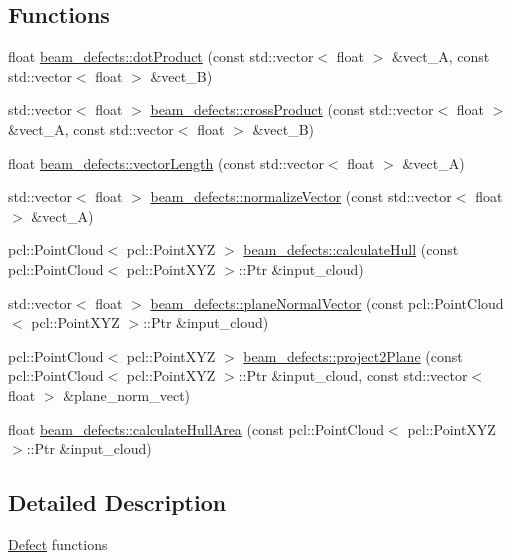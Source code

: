 \subsection*{Functions}
\begin{DoxyCompactItemize}
\item 
float \hyperlink{group__defects_ga5b7a4f073fbd3207f691f74f63434760}{beam\+\_\+defects\+::dot\+Product} (const std\+::vector$<$ float $>$ \&vect\+\_\+A, const std\+::vector$<$ float $>$ \&vect\+\_\+B)
\item 
std\+::vector$<$ float $>$ \hyperlink{group__defects_gacd54112957db923dfdbe7c0ef41bb462}{beam\+\_\+defects\+::cross\+Product} (const std\+::vector$<$ float $>$ \&vect\+\_\+A, const std\+::vector$<$ float $>$ \&vect\+\_\+B)
\item 
float \hyperlink{group__defects_ga08560ea24958bd0c8ff074c2cb15c946}{beam\+\_\+defects\+::vector\+Length} (const std\+::vector$<$ float $>$ \&vect\+\_\+A)
\item 
std\+::vector$<$ float $>$ \hyperlink{group__defects_ga1f650bbe03aace0d1b8a53291f6f41ed}{beam\+\_\+defects\+::normalize\+Vector} (const std\+::vector$<$ float $>$ \&vect\+\_\+A)
\item 
pcl\+::\+Point\+Cloud$<$ pcl\+::\+Point\+X\+YZ $>$ \hyperlink{group__defects_ga748f611e9ef5f651b856652b0cb5ed7e}{beam\+\_\+defects\+::calculate\+Hull} (const pcl\+::\+Point\+Cloud$<$ pcl\+::\+Point\+X\+YZ $>$\+::Ptr \&input\+\_\+cloud)
\item 
std\+::vector$<$ float $>$ \hyperlink{group__defects_gafee51f4fea21e59f8574542070c232ec}{beam\+\_\+defects\+::plane\+Normal\+Vector} (const pcl\+::\+Point\+Cloud$<$ pcl\+::\+Point\+X\+YZ $>$\+::Ptr \&input\+\_\+cloud)
\item 
pcl\+::\+Point\+Cloud$<$ pcl\+::\+Point\+X\+YZ $>$ \hyperlink{group__defects_ga66ab589a0ee34e37b51df5fed01576c6}{beam\+\_\+defects\+::project2\+Plane} (const pcl\+::\+Point\+Cloud$<$ pcl\+::\+Point\+X\+YZ $>$\+::Ptr \&input\+\_\+cloud, const std\+::vector$<$ float $>$ \&plane\+\_\+norm\+\_\+vect)
\item 
float \hyperlink{group__defects_ga2f624f208e79c917731b7bba9c202a71}{beam\+\_\+defects\+::calculate\+Hull\+Area} (const pcl\+::\+Point\+Cloud$<$ pcl\+::\+Point\+X\+YZ $>$\+::Ptr \&input\+\_\+cloud)
\end{DoxyCompactItemize}


\subsection{Detailed Description}
\hyperlink{classbeam__defects_1_1_defect}{Defect} functions 

